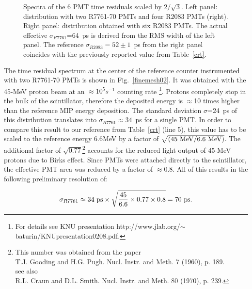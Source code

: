\begin{figure}[htbp]
\vspace{8.0cm}
\caption{\small{Spectra of the 6 PMT time residuals scaled by $2/\sqrt{3}$.
Left panel: distribution with two R7761-70 PMTs and four R2083 PMTs (right).  
Right panel: distribution obtained with six R2083 PMTs.  The actual effective
$\sigma_{R7761}$=64~ps is derived from the RMS width of the left panel.  The  
reference $\sigma_{R2083}=52 \pm 1$~ps from the right panel coincides with 
the previously reported value from Table~\ref{crt}.}}
\label{finemesh01}
\end{figure}

The time residual spectrum  at the center of the reference counter
instrumented with two R7761-70 PMTs is shown in Fig.~\ref{finemesh02}.  
It was obtained with the 45-MeV proton beam at an $\approx10^5s^{-1}$ 
counting rate \footnote{For details see KNU presentation 
http://www.jlab.org/$\sim$baturin/KNUpresentation0208.pdf.}.  Protons completely 
stop in the bulk of the scintillator, therefore the deposited energy is 
$\approx$10 times higher than the reference MIP energy deposition.  The standard 
deviation $\sigma$=24~ps of this distribution translates into 
$\sigma_{R7761}\approx 34$~ps for a single PMT.  In order to compare this result 
to our reference from Table~\ref{crt} (line 5), this value has to be scaled to 
the reference energy 6.6MeV by a factor of $\sqrt{(45~{\rm MeV}/6.6~{\rm MeV})}$.  The 
additional  factor of $\sqrt{0.77}
$\footnote{This number was obtained from 
the paper\\
T.J. Gooding and H.G. Pugh. Nucl. Instr. and Meth. 7 (1960), p. 189.\\
see also \\
R.L. Craun and D.L. Smith. Nucl. Instr. and Meth. 80 (1970), p. 239.}
accounts for the reduced light output of 45-MeV protons due to Birks effect.
Since PMTs were attached directly to the scintillator, the effective PMT area was reduced by a 
factor of $\approx$0.8. All of this results in the following preliminary  
resolution of:

\begin{equation}
\sigma_{R7761} \approx 34~{\rm ps} \times \sqrt{\frac{45}{6.6} \times 0.77 \times 0.8 }
= 70~{\rm ps}.
\label{eq776}
\end{equation}

